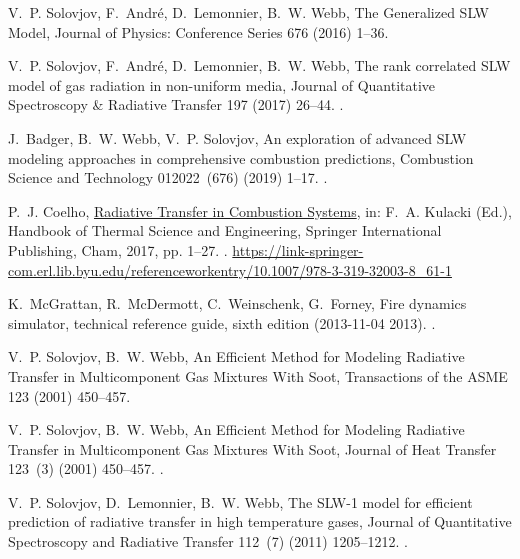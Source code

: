 \documentclass[preprint,12pt]{elsarticle}
\begin{document}
\begin{thebibliography}{10}
V.~P. Solovjov, F.~Andr{\'e}, D.~Lemonnier, B.~W. Webb, {The Generalized {SLW}
  Model}, {Journal of Physics: Conference Series} 676 (2016) 1--36.

V.~P. Solovjov, F.~Andr{\'e}, D.~Lemonnier, B.~W. Webb, {The rank correlated
  {SLW} model of gas radiation in non-uniform media}, {Journal of Quantitative
  Spectroscopy {\&} Radiative Transfer} 197 (2017) 26--44.
\newblock \href {http://dx.doi.org/10.1016/j.jqsrt.2017.01.034}
  {}.

J.~Badger, B.~W. Webb, V.~P. Solovjov, {An exploration of advanced {SLW}
  modeling approaches in comprehensive combustion predictions}, {Combustion
  Science and Technology} 012022~(676) (2019) 1--17.
\newblock \href {http://dx.doi.org/10.1080/00102202.2019.1678907}
  {}.

P.~J. Coelho,
  \href{https://link-springer-com.erl.lib.byu.edu/referenceworkentry/10.1007/978-3-319-32003-8_61-1}{{Radiative
  Transfer in Combustion Systems}}, in: F.~A. Kulacki (Ed.), {Handbook of
  Thermal Science and Engineering}, {Springer International Publishing}, Cham,
  2017, pp. 1--27.
\newblock \href {http://dx.doi.org/10.1007/978-3-319-32003-8{\textunderscore
  }61-1} {}.
\newline\urlprefix\url{https://link-springer-com.erl.lib.byu.edu/referenceworkentry/10.1007/978-3-319-32003-8_61-1}

K.~McGrattan, R.~McDermott, C.~Weinschenk, G.~Forney, Fire dynamics simulator,
  technical reference guide, sixth edition (2013-11-04 2013).
\newblock \href {http://dx.doi.org/https://doi.org/10.6028/NIST.sp.1018}
  {}.

V.~P. Solovjov, B.~W. Webb, {An Efficient Method for Modeling Radiative
  Transfer in Multicomponent Gas Mixtures With Soot}, {Transactions of the
  ASME} 123 (2001) 450--457.

V.~P. Solovjov, B.~W. Webb, {An Efficient Method for Modeling Radiative
  Transfer in Multicomponent Gas Mixtures With Soot}, {Journal of Heat
  Transfer} 123~(3) (2001) 450--457.
\newblock \href {http://dx.doi.org/10.1115/1.1350824}
  {}.

V.~P. Solovjov, D.~Lemonnier, B.~W. Webb, {The {SLW}-1 model for efficient
  prediction of radiative transfer in high temperature gases}, {Journal of
  Quantitative Spectroscopy and Radiative Transfer} 112~(7) (2011) 1205--1212.
\newblock \href {http://dx.doi.org/10.1016/j.jqsrt.2010.08.009}
  {}.


\end{thebibliography}
\end{document}

